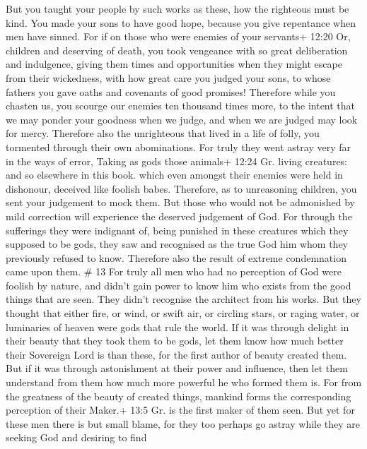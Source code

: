  But you taught your people by such works as these, how the
righteous must be kind. You made your sons to have good hope, because
you give repentance when men have sinned.  For if on those
who were enemies of your servants+ 12:20 Or, children and deserving of
death, you took vengeance with so great deliberation and indulgence,
giving them times and opportunities when they might escape from their
wickedness,  with how great care you judged your sons, to
whose fathers you gave oaths and covenants of good promises!
 Therefore while you chasten us, you scourge our enemies
ten thousand times more, to the intent that we may ponder your goodness
when we judge, and when we are judged may look for mercy. 
Therefore also the unrighteous that lived in a life of folly, you
tormented through their own abominations.  For truly they
went astray very far in the ways of error, Taking as gods those animals+
12:24 Gr. living creatures: and so elsewhere in this book. which even
amongst their enemies were held in dishonour, deceived like foolish
babes.  Therefore, as to unreasoning children, you sent
your judgement to mock them.  But those who would not be
admonished by mild correction will experience the deserved judgement of
God.  For through the sufferings they were indignant of,
being punished in these creatures which they supposed to be gods, they
saw and recognised as the true God him whom they previously refused to
know. Therefore also the result of extreme condemnation came upon them.
\# 13  For truly all men who had no perception of God were
foolish by nature, and didn't gain power to know him who exists from the
good things that are seen. They didn't recognise the architect from his
works.  But they thought that either fire, or wind, or swift
air, or circling stars, or raging water, or luminaries of heaven were
gods that rule the world.  If it was through delight in
their beauty that they took them to be gods, let them know how much
better their Sovereign Lord is than these, for the first author of
beauty created them.  But if it was through astonishment at
their power and influence, then let them understand from them how much
more powerful he who formed them is.  For from the greatness
of the beauty of created things, mankind forms the corresponding
perception of their Maker.+ 13:5 Gr. is the first maker of them seen.
 But yet for these men there is but small blame, for they
too perhaps go astray while they are seeking God and desiring to find
